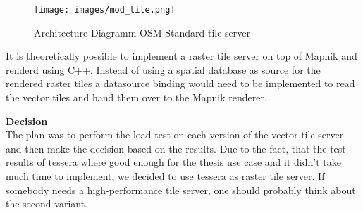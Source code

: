 \begin{figure}[H]
  \texttt{[image: images/mod\_tile.png]}
  \caption{Architecture Diagramm OSM Standard tile server}
\end{figure}

It is theoretically possible to implement a raster tile server
on top of Mapnik and renderd using C++. Instead of using a spatial database as source for the rendered raster tiles a datasource binding would need to be implemented to read the vector tiles and hand them over to the Mapnik renderer. 

\begin{tcolorbox}\label{tile_server_decision}
\textbf{Decision} \\
The plan was to perform the load test on each version of the vector tile server and then make the decision based on the results. Due to the fact, that the test results of tessera where good enough for the thesis use case and it didn't take much time to implement, we decided to use tessera as raster tile server.
If somebody needs a high-performance tile server, one should probably think about the second variant.
\end{tcolorbox}
